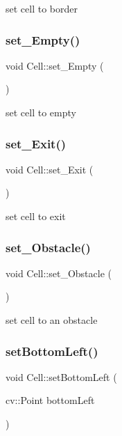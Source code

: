 set cell to border \mbox{\label{class_cell_a8e990447fa7c048d0246ee88640b5060}} 
\subsubsection{\texorpdfstring{set\+\_\+\+Empty()}{set\_Empty()}}
{\footnotesize\ttfamily void Cell\+::set\+\_\+\+Empty (\begin{DoxyParamCaption}{ }\end{DoxyParamCaption})}

set cell to empty \mbox{\label{class_cell_a0d8dcfcd6f3f40ce6179cf8fed4694ec}} 
\subsubsection{\texorpdfstring{set\+\_\+\+Exit()}{set\_Exit()}}
{\footnotesize\ttfamily void Cell\+::set\+\_\+\+Exit (\begin{DoxyParamCaption}{ }\end{DoxyParamCaption})}

set cell to exit \mbox{\label{class_cell_af7d43434293cf3df61c07b95af4c3be6}} 
\subsubsection{\texorpdfstring{set\+\_\+\+Obstacle()}{set\_Obstacle()}}
{\footnotesize\ttfamily void Cell\+::set\+\_\+\+Obstacle (\begin{DoxyParamCaption}{ }\end{DoxyParamCaption})}

set cell to an obstacle \mbox{\label{class_cell_a86387a50a4c3f641eede253ce6cfcddb}} 
\subsubsection{\texorpdfstring{set\+Bottom\+Left()}{setBottomLeft()}}
{\footnotesize\ttfamily void Cell\+::set\+Bottom\+Left (\begin{DoxyParamCaption}\item[{cv\+::\+Point}]{bottom\+Left }\end{DoxyParamCaption})}


